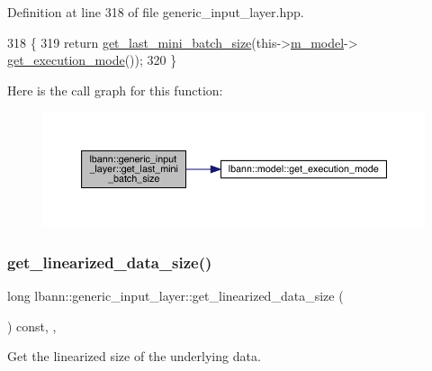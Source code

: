 Definition at line 318 of file generic\+\_\+input\+\_\+layer.\+hpp.


\begin{DoxyCode}
318                                                \{
319     \textcolor{keywordflow}{return} \hyperlink{classlbann_1_1generic__input__layer_aebca4bd6660ee5b7f99129bd84ed4f8d}{get\_last\_mini\_batch\_size}(this->\hyperlink{classlbann_1_1Layer_a3d9315e99574166f2f33e37b572021d2}{m\_model}->
      \hyperlink{classlbann_1_1model_addb40597cf29aa6d31b6a7d09ef48608}{get\_execution\_mode}());
320   \}
\end{DoxyCode}
Here is the call graph for this function\+:\nopagebreak
\begin{figure}[H]
\begin{center}
\leavevmode
\includegraphics[width=350pt]{classlbann_1_1generic__input__layer_aebca4bd6660ee5b7f99129bd84ed4f8d_cgraph}
\end{center}
\end{figure}
\mbox{\label{classlbann_1_1generic__input__layer_aca46cbf29ad2762e9329b46ab2ad1ae7}} 
\subsubsection{\texorpdfstring{get\+\_\+linearized\+\_\+data\+\_\+size()}{get\_linearized\_data\_size()}}
{\footnotesize\ttfamily long lbann\+::generic\+\_\+input\+\_\+layer\+::get\+\_\+linearized\+\_\+data\+\_\+size (\begin{DoxyParamCaption}{ }\end{DoxyParamCaption}) const\hspace{0.3cm}{\ttfamily [inline]}, {\ttfamily [override]}, {\ttfamily [virtual]}}

Get the linearized size of the underlying data. 

